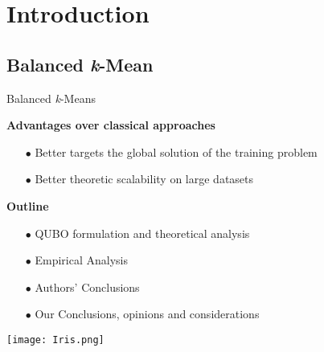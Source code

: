 \section{Introduction}

\subsection{Balanced \textit{k}-Mean}
	\begin{frame}{Balanced \textit{k}-Means} %
		\small
		\begin{minipage}{0.5\textwidth} %
			\textbf{Advantages over classical approaches}
			\begin{itemize}
				\item[$\bullet$] Better targets the global solution of the training problem  
				\item[$\bullet$] Better theoretic scalability on large datasets
			\end{itemize}
		\end{minipage}\hfill
		\begin{minipage}{0.5\textwidth}
			\textbf{Outline}
			\begin{itemize}
				\item[$\bullet$] QUBO formulation and theoretical analysis
				\item[$\bullet$] Empirical Analysis 
				\item[$\bullet$] Authors' Conclusions
				\item[$\bullet$] Our Conclusions, opinions and considerations
			\end{itemize}
		\end{minipage}
		\texttt{[image: Iris.png]}
	\end{frame}
	




